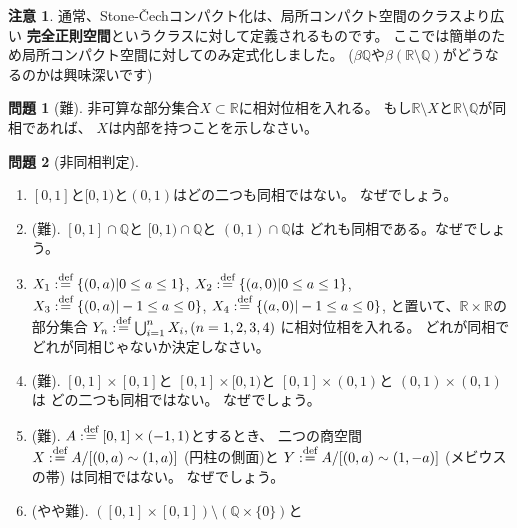 \documentclass[uplatex]{jsarticle}
\theoremstyle{definition}
\newtheorem{prob}[prob]{問題}
\newtheorem*{rem*}{注意}
\newcommand{\dfn}{:\overset{\mbox{{\scriptsize def}}}{=}}
\newcommand{\R}{\mathbb{R}}
\newcommand{\Q}{\mathbb{Q}}
\begin{document}
\begin{rem*}
  通常、Stone-\v{C}echコンパクト化は、局所コンパクト空間のクラスより広い
  \textbf{完全正則空間}というクラスに対して定義されるものです。
  ここでは簡単のため局所コンパクト空間に対してのみ定式化しました。
  (\(\beta \Q\)や\(\beta (\R\setminus \Q)\)がどうなるのかは興味深いです)
\end{rem*}




\begin{prob}[難]
  非可算な部分集合\(X\subset \R\)に相対位相を入れる。
  もし\(\R\setminus X\)と\(\R\setminus \Q\)が同相であれば、
  \(X\)は内部を持つことを示しなさい。
\end{prob}




\begin{prob}[非同相判定]
  \
  \begin{enumerate}
    \item
    \([0,1]\)と\([0,1)\)と\((0,1)\)はどの二つも同相ではない。
    なぜでしょう。
    \item (難).
    \([0,1]\cap \Q\)と
    \([0,1)\cap \Q\)と
    \((0,1)\cap \Q\)は
    どれも同相である。なぜでしょう。
    \item
    \(X_1 \dfn \{(0,a) | 0\leq a \leq 1\}\),
    \(X_2 \dfn \{(a,0) | 0\leq a \leq 1\}\),
    \(X_3 \dfn \{(0,a) | -1\leq a \leq 0\}\),
    \(X_4 \dfn \{(a,0) | -1\leq a \leq 0\}\),
    と置いて、\(\R\times \R\)の部分集合
    \(Y_n\dfn \bigcup_{i=1}^n X_i, (n=1,2,3,4)\)
    に相対位相を入れる。
    どれが同相でどれが同相じゃないか決定しなさい。
    \item (難).
    \([0,1]\times [0,1]\)と
    \([0,1]\times [0,1)\)と
    \([0,1]\times (0,1)\)と
    \((0,1)\times (0,1)\)は
    どの二つも同相ではない。
    なぜでしょう。
    \item (難).
    \(A\dfn [0,1]\times (-1,1)\)とするとき、
    二つの商空間
    \(X\dfn A/[(0,a) \sim (1,a)]\) (円柱の側面)と
    \(Y\dfn A/[(0,a) \sim (1,-a)]\) (メビウスの帯) は同相ではない。
    なぜでしょう。
    \item (やや難).
    \(([0,1]\times [0,1])\setminus (\Q\times \{0\})\)と

\end{enumerate}
\end{prob}
\end{document}
